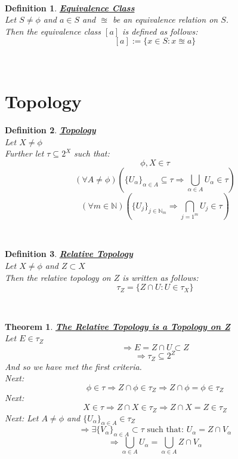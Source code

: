 \documentclass[12pt]{extarticle}
\theoremstyle{plain}
\newtheorem{thm}{Theorem}[section]
\theoremstyle{plain}
\theoremstyle{plain}
\theoremstyle{Definition}
\newtheorem{def.}{Definition}[section]
\theoremstyle{Definition}
\theoremstyle{plain}
\theoremstyle{plain}
\newcommand{\cut}[0]{\noindent\framebox[\linewidth]{\rule{\linewidth}{2pt}}\\}
\begin{document}
\cut
\begin{def.} \underline{\textbf{Equivalence Class}} \\
	Let $S \not = \phi$ and $a \in S$ and $\approxeq$ be an equivalence relation on $S$. \\
	Then the equivalence class $[a]$ is defined as follows: 
		$$[a] := \{x \in S : x \approxeq a\}$$
\end{def.}
\cut
\section{Topology}

\begin{def.} \underline{\textbf{Topology}} \\
	Let $X \not = \phi$ \\ 
	Further let $\tau \subseteq 2^X$ such that: \\ 
	$$\phi,X \in \tau$$
	$$(\forall A \not = \phi)\left(\{U_\alpha\}_{\alpha \in A} \subseteq \tau \Rightarrow \bigcup_{\alpha \in A} U_\alpha \in \tau\right)$$
	$$(\forall m \in \mathbb{N})\left(\{U_j\}_{j\in \mathbb{N}_m} \Rightarrow \bigcap_{j=1^m} U_j \in \tau\right)$$
\end{def.}
\cut
\begin{def.} \underline{\textbf{Relative Topology}} \\
	Let $X \not = \phi$ and $Z \subset X$ \\ 
	Then the relative topology on $Z$ is written as follows: \\ 
	$$\tau_Z = \{Z \cap U : U \in \tau_X\}$$
\end{def.}
\cut
\begin{thm} \underline{\textbf{The Relative Topology is a Topology on Z}} \\
	Let $E \in \tau_Z$ \\
	$$\Rightarrow E = Z \cap U \subset Z$$
	$$\Rightarrow \tau_Z \subseteq 2^Z$$
	And so we have met the first criteria. \\ 
	Next: 
	$$\phi \in \tau \Rightarrow Z \cap \phi \in \tau_Z \Rightarrow Z \cap \phi = \phi \in \tau_Z$$
	Next: 
	$$X \in \tau \Rightarrow Z \cap X \in \tau_Z \Rightarrow Z \cap X = Z \in \tau_Z$$
	Next: 
	Let $A \not = \phi$ and $\{U_\alpha\}_{\alpha \in A} \in \tau_Z$ \\ 
	$$\Rightarrow \exists \{V_\alpha\}_{\alpha \in A} \subset \tau \text{ such that: } U_\alpha = Z \cap V_\alpha$$
	$$\Rightarrow \bigcup_{\alpha \in A} U_\alpha = \bigcup_{\alpha \in A} Z \cap V_\alpha$$
\end{thm}
\cut
\end{document}
